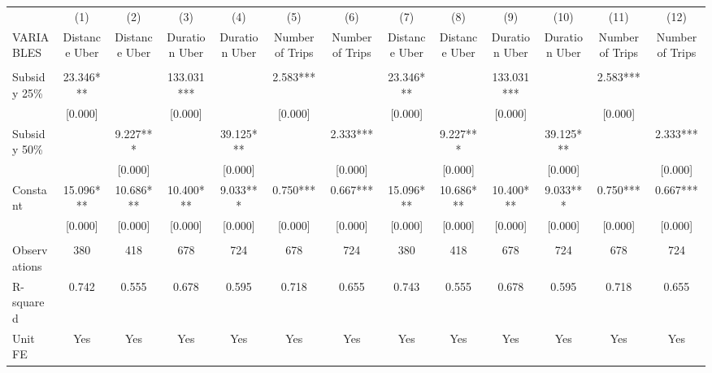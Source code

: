 \begin{tabular}{lcccccccccccc} \hline
 & (1) & (2) & (3) & (4) & (5) & (6) & (7) & (8) & (9) & (10) & (11) & (12) \\
VARIABLES & Distance Uber & Distance Uber & Duration Uber & Duration Uber & Number of Trips & Number of Trips & Distance Uber & Distance Uber & Duration Uber & Duration Uber & Number of Trips & Number of Trips \\ \hline
 &  &  &  &  &  &  &  &  &  &  &  &  \\
Subsidy 25\% & 23.346*** &  & 133.031*** &  & 2.583*** &  & 23.346*** &  & 133.031*** &  & 2.583*** &  \\
 & [0.000] &  & [0.000] &  & [0.000] &  & [0.000] &  & [0.000] &  & [0.000] &  \\
Subsidy 50\% &  & 9.227*** &  & 39.125*** &  & 2.333*** &  & 9.227*** &  & 39.125*** &  & 2.333*** \\
 &  & [0.000] &  & [0.000] &  & [0.000] &  & [0.000] &  & [0.000] &  & [0.000] \\
Constant & 15.096*** & 10.686*** & 10.400*** & 9.033*** & 0.750*** & 0.667*** & 15.096*** & 10.686*** & 10.400*** & 9.033*** & 0.750*** & 0.667*** \\
 & [0.000] & [0.000] & [0.000] & [0.000] & [0.000] & [0.000] & [0.000] & [0.000] & [0.000] & [0.000] & [0.000] & [0.000] \\
 &  &  &  &  &  &  &  &  &  &  &  &  \\
Observations & 380 & 418 & 678 & 724 & 678 & 724 & 380 & 418 & 678 & 724 & 678 & 724 \\
R-squared & 0.742 & 0.555 & 0.678 & 0.595 & 0.718 & 0.655 & 0.743 & 0.555 & 0.678 & 0.595 & 0.718 & 0.655 \\
 Unit FE & Yes & Yes & Yes & Yes & Yes & Yes & Yes & Yes & Yes & Yes & Yes & Yes \\ \hline
\end{tabular}
